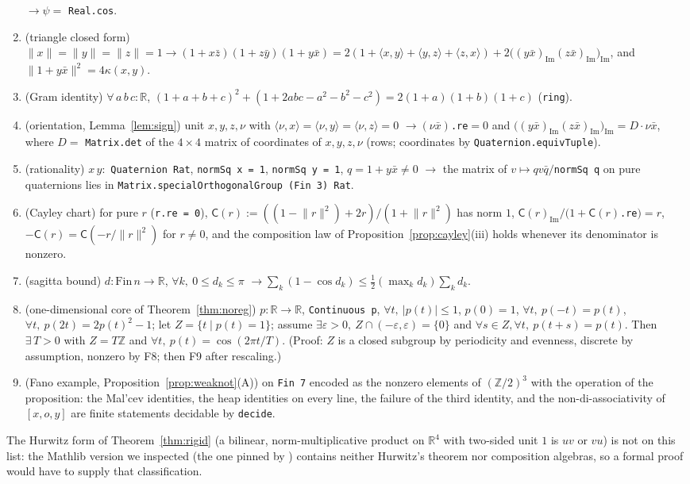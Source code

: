 \documentclass[11pt,reqno]{amsart}
\theoremstyle{definition}
\theoremstyle{remark}
\numberwithin{equation}{section}
\newcommand{\R}{\mathbb{R}}
\newcommand{\Z}{\mathbb{Z}}
\newcommand{\im}{\operatorname{Im}}
\newcommand{\ip}[2]{\langle #1,#2\rangle}
\newcommand{\hp}[3]{[#1,#2,#3]}
\newcommand{\Cay}{\mathsf{C}}
\begin{document}
\begin{enumerate}[label=\textbf{F\arabic*.},leftmargin=2.4em]
$\to\psi=$ \texttt{Real.cos}.
\item (triangle closed form) $\lVert x\rVert=\lVert y\rVert=\lVert z\rVert=1\to(1+x\bar z)(1+z\bar y)(1+y\bar x)=
2(1+\ip xy+\ip yz+\ip zx)+2\bigl((y\bar x)_{\im}(z\bar x)_{\im}\bigr)_{\im}$, and $\lVert1+y\bar x\rVert^2=4\kappa(x,y)$.
\item (Gram identity) $\forall\,a\,b\,c:\R$, $(1+a+b+c)^2+(1+2abc-a^2-b^2-c^2)=2(1+a)(1+b)(1+c)$ (\texttt{ring}).
\item (orientation, Lemma~\ref{lem:sign}) unit $x,y,z,\nu$ with $\ip\nu x=\ip\nu y=\ip\nu z=0$ $\to(\nu\bar x)$\texttt{.re}$=0$ and
$\bigl((y\bar x)_{\im}(z\bar x)_{\im}\bigr)_{\im}=D\cdot\nu\bar x$, where $D=$ \texttt{Matrix.det} of the $4\times4$ matrix of coordinates
of $x,y,z,\nu$ (rows; coordinates by \texttt{Quaternion.equivTuple}).
\item (rationality) $x\,y:$ \texttt{Quaternion Rat}, \texttt{normSq x = 1}, \texttt{normSq y = 1}, $q=1+y\bar x\ne0$ $\to$ the matrix of
$v\mapsto qv\bar q/$\texttt{normSq q} on pure quaternions lies in \texttt{Matrix.specialOrthogonalGroup (Fin 3) Rat}.
\item (Cayley chart) for pure $r$ (\texttt{r.re = 0}), $\Cay(r):=((1-\lVert r\rVert^2)+2r)/(1+\lVert r\rVert^2)$ has norm $1$,
$\Cay(r)_{\im}/(1+\Cay(r)$\texttt{.re}$)=r$, $-\Cay(r)=\Cay(-r/\lVert r\rVert^2)$ for $r\ne0$, and the composition law of
Proposition~\ref{prop:cayley}(iii) holds whenever its denominator is nonzero.
\item (sagitta bound) $d:\mathrm{Fin}\,n\to\R$, $\forall k,\ 0\le d_k\le\pi$ $\to\sum_k(1-\cos d_k)\le\tfrac12(\max_kd_k)\sum_kd_k$.
\item (one-dimensional core of Theorem~\ref{thm:noreg}) $p:\R\to\R$, \texttt{Continuous p}, $\forall t,\ \lvert p(t)\rvert\le1$,
$p(0)=1$, $\forall t,\ p(-t)=p(t)$, $\forall t,\ p(2t)=2p(t)^2-1$; let $Z=\{t\mid p(t)=1\}$; assume $\exists\varepsilon>0,\
Z\cap(-\varepsilon,\varepsilon)=\{0\}$ and $\forall s\in Z,\forall t,\ p(t+s)=p(t)$.  Then $\exists\,T>0$ with $Z=T\Z$ and
$\forall t,\ p(t)=\cos(2\pi t/T)$.  (Proof: $Z$ is a closed subgroup by periodicity and evenness, discrete by assumption,
nonzero by F8; then F9 after rescaling.)
\item (Fano example, Proposition~\ref{prop:weaknot}(A)) on \texttt{Fin 7} encoded as the nonzero elements of
$(\Z/2)^3$ with the operation of the proposition: the Mal'cev identities, the heap identities on every line, the failure of
the third identity, and the non-di-associativity of $\hp xoy$ are finite statements decidable by \texttt{decide}.
\end{enumerate}
The Hurwitz form of Theorem~\ref{thm:rigid} (a bilinear, norm-multiplicative product on $\R^4$ with two-sided unit $1$ is
$uv$ or $vu$) is not on this list: the Mathlib version we inspected (the one pinned by \cite{Tru}) contains neither Hurwitz's
theorem nor composition algebras, so a formal proof would have to supply that classification.
\end{document}
